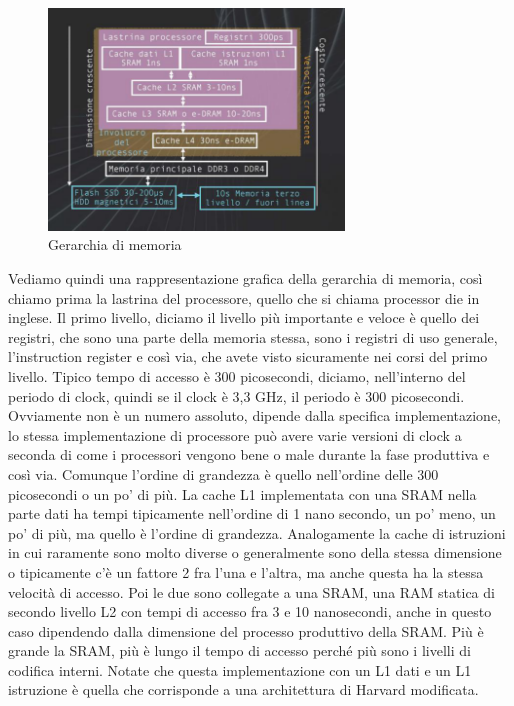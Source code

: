 \FloatBarrier
\begin{figure}[H]
  \centering
  \includegraphics[width=0.70\textwidth,
                    trim=20 20 10 20, %
                    clip]
                    {images/Lez06_p01_fig_06.png}
  \caption{Gerarchia di memoria}
  \label{fig:Lez06_p01_fig_06}
\end{figure}
\FloatBarrier
\noindent

Vediamo quindi una rappresentazione grafica della gerarchia di memoria, così chiamo prima la lastrina del processore, quello che si chiama processor die in inglese.
Il primo livello, diciamo il livello più importante e veloce è quello dei registri, che sono una parte della memoria stessa, sono i registri di uso generale, l'instruction register e così via, che avete visto sicuramente nei corsi del primo livello.
Tipico tempo di accesso è 300 picosecondi, diciamo, nell'interno del periodo di clock, quindi se il clock è 3,3 GHz, il periodo è 300 picosecondi.
Ovviamente non è un numero assoluto, dipende dalla specifica implementazione, lo stessa implementazione di processore può avere varie versioni di clock a seconda di come i processori vengono bene o male durante la fase produttiva e così via.
Comunque l'ordine di grandezza è quello nell'ordine delle 300 picosecondi o un po' di più.
La cache L1 implementata con una SRAM nella parte dati ha tempi tipicamente nell'ordine di 1 nano secondo, un po' meno, un po' di più, ma quello è l'ordine di grandezza.
Analogamente la cache di istruzioni in cui raramente sono molto diverse o generalmente sono della stessa dimensione o tipicamente c'è un fattore 2 fra l'una e l'altra, ma anche questa ha la stessa velocità di accesso.
Poi le due sono collegate a una SRAM, una RAM statica di secondo livello L2 con tempi di accesso fra 3 e 10 nanosecondi, anche in questo caso dipendendo dalla dimensione del processo produttivo della SRAM.
Più è grande la SRAM, più è lungo il tempo di accesso perché più sono i livelli di codifica interni.
Notate che questa implementazione con un L1 dati e un L1 istruzione è quella che corrisponde a una architettura di Harvard modificata.

